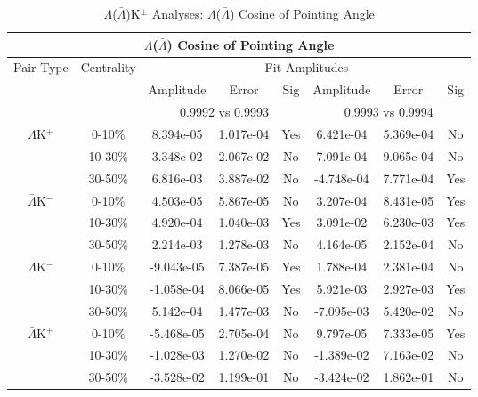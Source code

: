 \documentclass[../AnalysisNoteJBuxton.tex]{subfiles}
\begin{document}


\begin{table}
 \centering
 \begin{tabular}{|c|c|c|c|c||c|c|c|}
  \multicolumn{8}{c}{$\Lambda$($\bar{\Lambda}$) Cosine of Pointing Angle} \\
  \hline
  \multirow{3}{*}{Pair Type} & \multirow{3}{*}{Centrality} & \multicolumn{6}{c|}{Fit Amplitudes} \\
  \cline{3-8}
   & & Amplitude & Error & Sig & Amplitude & Error & Sig \\  
  \cline{3-8}
   & & \multicolumn{3}{c||}{0.9992 vs 0.9993} & \multicolumn{3}{c|}{0.9993 vs 0.9994} \\  
  \hline
  \multirow{3}{*}{$\Lambda$K$^{+}$}
   &  0-10\% & 8.394e-05 & 1.017e-04 & Yes & 6.421e-04 & 5.369e-04 & No \\
   & 10-30\% & 3.348e-02 & 2.067e-02 & No & 7.091e-04 & 9.065e-04 & No \\
   & 30-50\% & 6.816e-03 & 3.887e-02 & No & -4.748e-04 & 7.771e-04 & Yes \\
  \hline
  \multirow{3}{*}{$\bar{\Lambda}$K$^{-}$}
   &  0-10\% & 4.503e-05 & 5.867e-05 & No & 3.207e-04 & 8.431e-05 & Yes \\
   & 10-30\% & 4.920e-04 & 1.040e-03 & Yes & 3.091e-02 & 6.230e-03 & Yes \\
   & 30-50\% & 2.214e-03 & 1.278e-03 & No & 4.164e-05 & 2.152e-04 & No \\
  \hline \hline
  \multirow{3}{*}{$\Lambda$K$^{-}$}
   &  0-10\% & -9.043e-05 & 7.387e-05 & Yes & 1.788e-04 & 2.381e-04 & No \\
   & 10-30\% & -1.058e-04 & 8.066e-05 & Yes & 5.921e-03 & 2.927e-03 & Yes \\
   & 30-50\% & 5.142e-04 & 1.477e-03 & No & -7.095e-03 & 5.420e-02 & No \\
  \hline
  \multirow{3}{*}{$\bar{\Lambda}$K$^{+}$}
   &  0-10\% & -5.468e-05 & 2.705e-04 & No & 9.797e-05 & 7.333e-05 & Yes \\
   & 10-30\% & -1.028e-03 & 1.270e-02 & No & -1.389e-02 & 7.163e-02 & No \\
   & 30-50\% & -3.528e-02 & 1.199e-01 & No & -3.424e-02 & 1.862e-01 & No \\
  \hline
 \end{tabular}
 \caption{$\Lambda$($\bar{\Lambda}$)K$^{\pm}$ Analyses: $\Lambda$($\bar{\Lambda}$) Cosine of Pointing Angle}
 \label{tab:LamCosPointingAngleLamKch}
\end{table}
\end{document}
